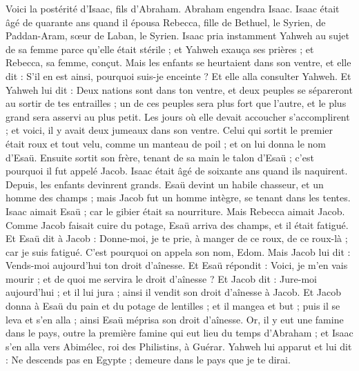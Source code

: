 \begin{multicols}{2}
Voici la postérité d'Isaac, fils d'Abraham.
Abraham engendra Isaac. Isaac était âgé de quarante ans quand il épousa Rebecca, fille de Bethuel, le Syrien, de Paddan-Aram, sœur de Laban, le Syrien.
Isaac pria instamment Yahweh au sujet de sa femme parce qu'elle était stérile ; et Yahweh exauça ses prières ; et Rebecca, sa femme, conçut.
Mais les enfants se heurtaient dans son ventre, et elle dit : S'il en est ainsi, pourquoi suis-je enceinte ? Et elle alla consulter Yahweh.
Et Yahweh lui dit : Deux nations sont dans ton ventre, et deux peuples se sépareront au sortir de tes entrailles ; un de ces peuples sera plus fort que l'autre, et le plus grand sera asservi au plus petit.
Les jours où elle devait accoucher s’accomplirent ; et voici, il y avait deux jumeaux dans son ventre.
Celui qui sortit le premier était roux et tout velu, comme un manteau de poil ; et on lui donna le nom d’Esaü.
Ensuite sortit son frère, tenant de sa main le talon d'Esaü ; c'est pourquoi il fut appelé Jacob. Isaac était âgé de soixante ans quand ils naquirent.
Depuis, les enfants devinrent grands. Esaü devint un habile chasseur, et un homme des champs ; mais Jacob fut un homme intègre, se tenant dans les tentes.
Isaac aimait Esaü ; car le gibier était sa nourriture. Mais Rebecca aimait Jacob.
Comme Jacob faisait cuire du potage, Esaü arriva des champs, et il était fatigué.
Et Esaü dit à Jacob : Donne-moi, je te prie, à manger de ce roux, de ce roux-là ; car je suis fatigué. C'est pourquoi on appela son nom, Edom.
Mais Jacob lui dit : Vends-moi aujourd'hui ton droit d'aînesse.
Et Esaü répondit : Voici, je m'en vais mourir ; et de quoi me servira le droit d'aînesse ?
Et Jacob dit : Jure-moi aujourd'hui ; et il lui jura ; ainsi il vendit son droit d'aînesse à Jacob.
Et Jacob donna à Esaü du pain et du potage de lentilles ; et il mangea et but ; puis il se leva et s'en alla ; ainsi Esaü méprisa son droit d'aînesse.
\VerseOne{}Or, il y eut une famine dans le pays, outre la première famine qui eut lieu du temps d'Abraham ; et Isaac s'en alla vers Abimélec, roi des Philistins, à Guérar.
Yahweh lui apparut et lui dit : Ne descends pas en Egypte ; demeure dans le pays que je te dirai.

\end{multicols}
